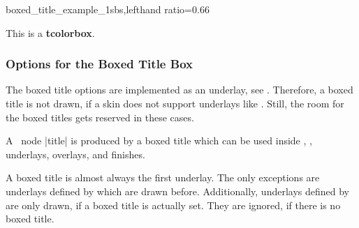 \begin{exdispExample*}{boxed_title_example_1}{sbs,lefthand ratio=0.66}
\begin{tcolorbox}[enhanced,title=My title,
  attach boxed title to top left=
    {xshift=-2mm,yshift=-2mm},
  boxed title style={size=small,colback=blue},
  show bounding box]
  This is a \textbf{tcolorbox}.
\end{tcolorbox}
\end{exdispExample*}


\clearpage
\subsubsection{Options for the Boxed Title Box}
\begin{marker}
  The boxed title options are implemented as an underlay, see .
  Therefore, a boxed title is not drawn, if a skin does not support underlays
  like . Still, the room for the boxed
  titles gets reserved in these cases.
\end{marker}

\begin{marker}
  A \tikzname\ node |title| is produced by a boxed title which can be used
  inside , ,
  underlays, overlays, and finishes.
\end{marker}

\begin{marker}
  A boxed title is almost always the first underlay. The only exceptions are
  underlays defined by  which are drawn
  before. Additionally, underlays defined by 
  are only drawn, if a boxed title is actually set. They are ignored, if
  there is no boxed title.
\end{marker}



